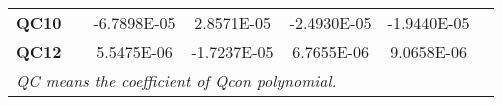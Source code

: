\begin{table}[h!]
\begin{adjustbox}{max width=\textwidth, center}
\begin{tabular}{c c c c c c c}
    \textbf{QC10} & & -6.7898E-05 &  2.8571E-05 & -2.4930E-05 & -1.9440E-05 & \\ 
   \rowcolor[gray]{0.9}  \textbf{QC12} & &  5.5475E-06 & -1.7237E-05 &  6.7655E-06 &  9.0658E-06 &\\
    \hline
    \multicolumn{6}{l}{\textit{\footnotesize{QC means the coefficient of Qcon polynomial.}}}\\
    \end{tabular}
    \end{adjustbox}
\end{table}

\setlength{\arrayrulewidth}{.5mm}
\setlength{\tabcolsep}{18pt}
\renewcommand{\arraystretch}{1.2}
